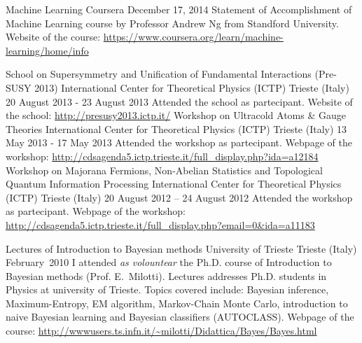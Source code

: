 \begin{cventries}
\cventry
{Machine Learning}
{Coursera}
{}
{December 17, 2014}
{Statement of Accomplishment of Machine Learning course by Professor Andrew Ng
   from Standford University.
   Website of the course:
   \url{https://www.coursera.org/learn/machine-learning/home/info}}


\cventry
{School on Supersymmetry and Unification of Fundamental Interactions (Pre-SUSY
   2013)}
   {International Center for Theoretical Physics (ICTP)}
{Trieste (Italy)}
{20 August 2013 - 23 August 2013}
{Attended the 
  school
   as partecipant. Website of the school:
   \url{http://presusy2013.ictp.it/}}
\cventry
{Workshop on Ultracold Atoms \& Gauge Theories}
   {International Center for Theoretical Physics (ICTP)}
{Trieste (Italy)}
{13 May 2013 - 17 May 2013}
{Attended 
   the workshop as
   partecipant.
   Webpage of the workshop:
   \url{http://cdsagenda5.ictp.trieste.it/full_display.php?ida=a12184}}
\cventry
{Workshop on Majorana Fermions, Non-Abelian Statistics and Topological Quantum Information Processing}%
   {International Center for Theoretical Physics (ICTP)}
{Trieste (Italy)}
{20 August 2012 -- 24 August 2012}
{Attended 
   the workshop 
   as
   partecipant. 
   Webpage of the workshop:
   \url{http://cdsagenda5.ictp.trieste.it/full_display.php?email=0&ida=a11183}}

\cventry
{Lectures of Introduction to Bayesian methods}
{University of Trieste}
{Trieste (Italy)}{}
{February~2010}%
{I attended \emph{as volountear} the Ph.D. course of Introduction to Bayesian methods (Prof.
   E.~Milotti).
   Lectures addresses Ph.D. students in Physics at university of Trieste.
Topics covered include: Bayesian inference, Maximum-Entropy, EM algorithm, Markov-Chain Monte Carlo, introduction to
naive Bayesian learning and 
Bayesian classifiers (AUTOCLASS). 
Webpage of the course:
\url{http://wwwusers.ts.infn.it/~milotti/Didattica/Bayes/Bayes.html}
}










\end{cventries}
